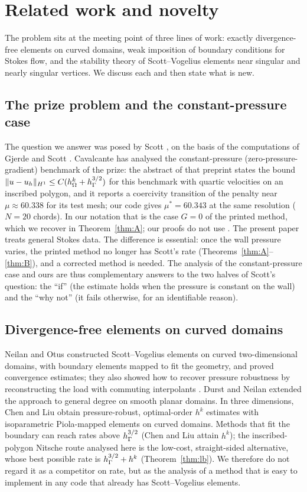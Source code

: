 \section{Related work and novelty}\label{sec:related}

The problem sits at the meeting point of three lines of work: exactly divergence-free elements on curved domains, weak imposition of boundary conditions for Stokes flow, and the stability theory of Scott--Vogelius elements near singular and nearly singular vertices. We discuss each and then state what is new.

\subsection{The prize problem and the constant-pressure case}
The question we answer was posed by Scott \cite{ScottPrize}, on the basis of the computations of Gjerde and Scott \cite{GjerdeScott2024}. Cavalcante \cite{Cavalcante} has analysed the constant-pressure (zero-pressure-gradient) benchmark of the prize: the abstract of that preprint states the bound $\lVert u-u_h\rVert_{H^1}\le C(h_\Omega^k+h_\Gamma^{3/2})$ for this benchmark with quartic velocities on an inscribed polygon, and it reports a coercivity transition of the penalty near $\mu\approx60.338$ for its test mesh; our code gives $\mu^\ast=60.343$ at the same resolution ($N=20$ chords). In our notation that is the case $G=0$ of the printed method, which we recover in Theorem~\ref{thm:A}; our proofs do not use \cite{Cavalcante}. The present paper treats general Stokes data. The difference is essential: once the wall pressure varies, the printed method no longer has Scott's rate (Theorems~\ref{thm:A}--\ref{thm:B}), and a corrected method is needed. The analysis of the constant-pressure case and ours are thus complementary answers to the two halves of Scott's question: the ``if'' (the estimate holds when the pressure is constant on the wall) and the ``why not'' (it fails otherwise, for an identifiable reason).

\subsection{Divergence-free elements on curved domains}
Neilan and Otus \cite{NeilanOtus2021} constructed Scott--Vogelius elements on curved two-dimensional domains, with boundary elements mapped to fit the geometry, and proved convergence estimates; they also showed how to recover pressure robustness by reconstructing the load with commuting interpolants \cite[Theorem~6.1]{NeilanOtus2021}. Durst and Neilan \cite{DurstNeilan2024} extended the approach to general degree on smooth planar domains. In three dimensions, Chen and Liu \cite{ChenLiu2026} obtain pressure-robust, optimal-order $h^k$ estimates with isoparametric Piola-mapped elements on curved domains. Methods that fit the boundary can reach rates above $h_\Gamma^{3/2}$ (Chen and Liu attain $h^k$); the inscribed-polygon Nitsche route analysed here is the low-cost, straight-sided alternative, whose best possible rate is $h_\Gamma^{3/2}+h^k$ (Theorem~\ref{thm:lb}). We therefore do not regard it as a competitor on rate, but as the analysis of a method that is easy to implement in any code that already has Scott--Vogelius elements.

